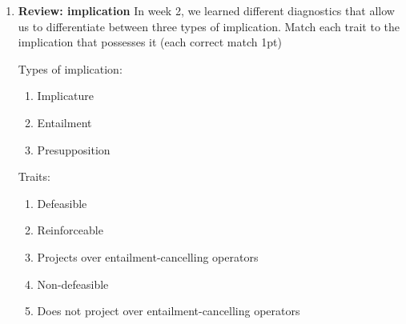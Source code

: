 \documentclass[a4,11pt]{article}
\newcommand{\6}{\mbox{$[\hspace*{-.6mm}[$}}
\newcommand{\9}{\mbox{$]\hspace*{-.6mm}]$}}
\begin{document}
\begin{enumerate}[leftmargin = 12pt]
Types of meaning:

\begin{enumerate}[noitemsep]
\item sentence meaning
\item utterance meaning
\end{enumerate}

Meanings:

\begin{enumerate}[noitemsep]
\item Andreas goes to Heidelberg every weekend
\item Andreas goes to Heidelberg every weekend and he is dating somebody in Heidelberg
\item Andreas is dating somebody in Heidelberg
\end{enumerate}

{\bf Model answer:} The sentence meaning is `Andreas goes to Heidelberg every weekend'; this is the semantic content of B. The utterance meaning is, as per p.139, ``the totality of what the speaker intends to convey by making an utterance'' and, as per p.143, ``composed of the sentence meaning plus any pragmatic inference created by the specific context of use''. Thus, the utterance meaning is `Andreas goes to Heidelberg every weekend and he is dating somebody in Heidelberg'.



\item { \bf Review: implication} In week 2, we learned different diagnostics that allow us to differentiate between three types of implication. Match each trait to the implication that possesses it (each correct match 1pt)

Types of implication:
\begin{enumerate}[noitemsep]
\item Implicature
\item Entailment
\item Presupposition
\end{enumerate}

Traits:
\begin{enumerate}[noitemsep]
\item Defeasible
\item Reinforceable
\item Projects over entailment-cancelling operators
\item Non-defeasible
\item Does not project over entailment-cancelling operators
\end{enumerate}


\end{enumerate}
\end{document}
